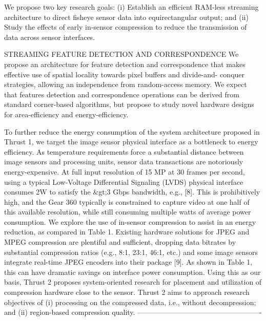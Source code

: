 We propose two key research goals: (i) Establish an efficient RAM-less streaming
architecture to direct fisheye sensor data into equirectangular output; and (ii) Study the effects
of early in-sensor compression to reduce the transmission of data across sensor interfaces.  \newline

STREAMING FEATURE DETECTION AND CORRESPONDENCE
We propose an architecture for feature detection and correspondence that makes effective use of spatial locality towards pixel buffers and divide-and- conquer strategies, allowing an independence from random-access memory. We expect that features detection and correspondence operations can be derived from standard corner-based algorithms, but propose to study novel hardware designs for area-efficiency and energy-efficiency. \newline

To further reduce the energy consumption of the system architecture proposed in Thrust 1, we target the image sensor physical interface as a bottleneck to energy efficiency. As temperature requirements force a substantial distance between image sensors and processing units, sensor data transactions are notoriously energy-expensive. At full input resolution of 15 MP at 30 frames per second, using a typical Low-Voltage Differential Signaling (LVDS) physical interface consumes 2W to satisfy the \&gt;3 Gbps bandwidth, e.g., [8]. This is prohibitively high, and the Gear 360 typically is constrained to capture video at one half of this available resolution, while still consuming multiple watts of average power consumption. We explore the use of in-sensor compression to assist in an energy reduction, as compared in Table 1. Existing hardware solutions for JPEG and MPEG compression are plentiful and sufficient, dropping data \newline
bitrates by substantial compression ratios (e.g., 8:1, 23:1, 46:1, etc.) and some image sensors integrate real-time JPEG encoders into their package [9]. As shown in Table 1, this can have dramatic savings on interface power consumption. Using this as our basis, Thrust 2 proposes system-oriented research for placement and utilization of compression hardware close to the sensor. Thrust 2 aims to approach research objectives of (i) processing on the compressed data, i.e., without decompression; and (ii) region-based compression quality.\newline
----------------------------------------------------


